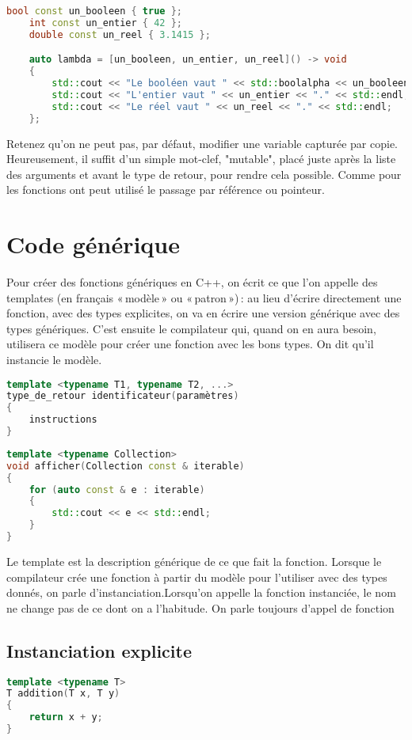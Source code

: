\documentclass{article}
\begin{document}
\begin{itemize}
\begin{lstlisting}[language=C++]
    bool const un_booleen { true };
    int const un_entier { 42 };
    double const un_reel { 3.1415 };

    auto lambda = [un_booleen, un_entier, un_reel]() -> void
    {
        std::cout << "Le booléen vaut " << std::boolalpha << un_booleen << "." << std::endl;
        std::cout << "L'entier vaut " << un_entier << "." << std::endl;
        std::cout << "Le réel vaut " << un_reel << "." << std::endl;
    };
\end{lstlisting}{}
Retenez qu’on ne peut pas, par défaut, modifier une variable capturée par copie. Heureusement, il suffit d’un simple mot-clef, "mutable", placé juste après la liste des arguments et avant le type de retour, pour rendre cela possible.
Comme pour les fonctions ont peut utilisé le passage par référence ou pointeur.

\section{Code générique}
Pour créer des fonctions génériques en C++, on écrit ce que l’on appelle des templates (en français « modèle » ou « patron ») : au lieu d’écrire directement une fonction, avec des types explicites, on va en écrire une version générique avec des types génériques. C’est ensuite le compilateur qui, quand on en aura besoin, utilisera ce modèle pour créer une fonction avec les bons types. On dit qu'il instancie le modèle.

\begin{lstlisting}[language=C++]
template <typename T1, typename T2, ...>
type_de_retour identificateur(paramètres)
{
    instructions
}
\end{lstlisting}{}

\begin{lstlisting}[language=C++]
template <typename Collection>
void afficher(Collection const & iterable)
{
    for (auto const & e : iterable)
    {
        std::cout << e << std::endl;
    }
}
\end{lstlisting}{}
Le template est la description générique de ce que fait la fonction. Lorsque le compilateur crée une fonction à partir du modèle pour l’utiliser avec des types donnés, on parle d’instanciation.Lorsqu’on appelle la fonction instanciée, le nom ne change pas de ce dont on a l’habitude. On parle toujours d’appel de fonction

\subsection{Instanciation explicite}
\begin{lstlisting}[language=C++]
template <typename T>
T addition(T x, T y)
{
    return x + y;
}


\end{lstlisting}
\end{itemize}
\end{document}
